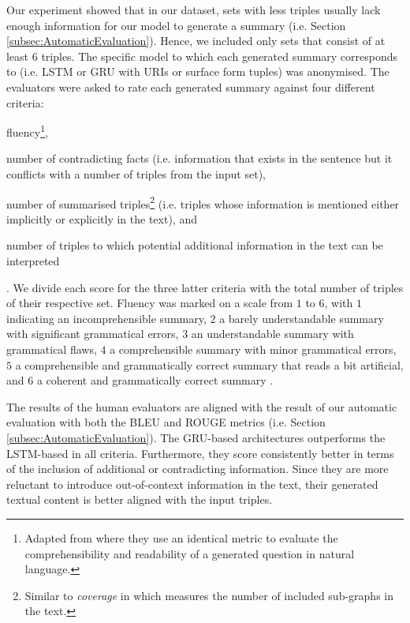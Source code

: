 \documentclass[preprint,5p]{elsarticle}
\begin{document}
Our experiment showed that in our dataset, sets with less triples usually lack enough information for our model to generate a summary (i.e. Section \ref{subsec:AutomaticEvaluation}). Hence, we included only sets that consist of at least $6$ triples. The specific model to which each generated summary corresponds to (i.e. LSTM or GRU with URIs or surface form tuples) was anonymised. The evaluators were asked to rate each generated summary against four different criteria:\begin{inparaenum}[(i)]\item fluency\footnote{Adapted from \cite{NgongaNgomo2013} where they use an identical metric to evaluate the comprehensibility and readability of a generated question in natural language.}, \item number of contradicting facts (i.e. information that exists in the sentence but it conflicts with a number of triples from the input set), \item number of summarised triples\footnote{Similar to \textit{coverage} in \cite{Ell2014} which measures the number of included sub-graphs in the text.} (i.e. triples whose information is mentioned either implicitly or explicitly in the text), and \item number of triples to which potential additional information in the text can be interpreted\end{inparaenum}. We divide each score for the three latter criteria with the total number of triples of their respective set. Fluency was marked on a scale from $1$ to $6$, with $1$ indicating an incomprehensible summary, $2$ a barely understandable summary with significant grammatical errors, $3$ an understandable summary with grammatical flaws, $4$ a comprehensible summary with minor grammatical errors, $5$ a comprehensible and grammatically correct summary that reads a bit artificial, and $6$ a coherent and grammatically correct summary \cite{NgongaNgomo2013}.



The results of the human evaluators are aligned with the result of our automatic evaluation with both the BLEU and ROUGE metrics (i.e. Section \ref{subsec:AutomaticEvaluation}). The GRU-based architectures outperforms the LSTM-based in all criteria. Furthermore, they score consistently better in terms of the inclusion of additional or contradicting information. Since they are more reluctant to introduce out-of-context information in the text, their generated textual content is better aligned with the input triples.
\end{document}
